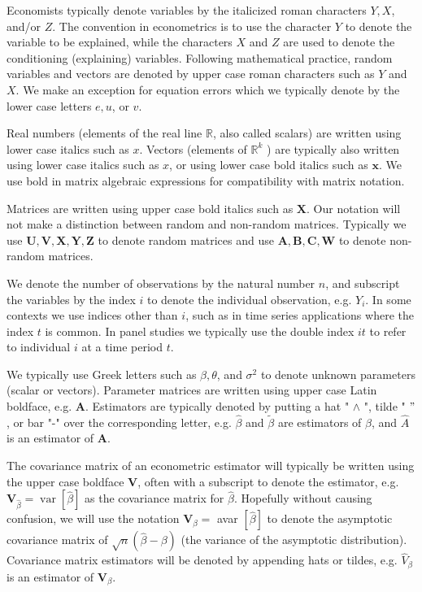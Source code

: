 \documentclass[10pt]{article}
\begin{document}
Economists typically denote variables by the italicized roman characters $Y, X$, and/or $Z$. The convention in econometrics is to use the character $Y$ to denote the variable to be explained, while the characters $X$ and $Z$ are used to denote the conditioning (explaining) variables. Following mathematical practice, random variables and vectors are denoted by upper case roman characters such as $Y$ and $X$. We make an exception for equation errors which we typically denote by the lower case letters $e, u$, or $v$.

Real numbers (elements of the real line $\mathbb{R}$, also called scalars) are written using lower case italics such as $x$. Vectors (elements of $\mathbb{R}^{k}$ ) are typically also written using lower case italics such as $x$, or using lower case bold italics such as $\boldsymbol{x}$. We use bold in matrix algebraic expressions for compatibility with matrix notation.

Matrices are written using upper case bold italics such as $\boldsymbol{X}$. Our notation will not make a distinction between random and non-random matrices. Typically we use $\boldsymbol{U}, \boldsymbol{V}, \boldsymbol{X}, \boldsymbol{Y}, \boldsymbol{Z}$ to denote random matrices and use $\boldsymbol{A}, \boldsymbol{B}, \boldsymbol{C}, \boldsymbol{W}$ to denote non-random matrices.

We denote the number of observations by the natural number $n$, and subscript the variables by the index $i$ to denote the individual observation, e.g. $Y_{i}$. In some contexts we use indices other than $i$, such as in time series applications where the index $t$ is common. In panel studies we typically use the double index $i t$ to refer to individual $i$ at a time period $t$.

We typically use Greek letters such as $\beta, \theta$, and $\sigma^{2}$ to denote unknown parameters (scalar or vectors). Parameter matrices are written using upper case Latin boldface, e.g. $\boldsymbol{A}$. Estimators are typically denoted by putting a hat " $\wedge$ ", tilde " $"$, or bar "-" over the corresponding letter, e.g. $\widehat{\beta}$ and $\widetilde{\beta}$ are estimators of $\beta$, and $\widehat{A}$ is an estimator of $\boldsymbol{A}$.

The covariance matrix of an econometric estimator will typically be written using the upper case boldface $\boldsymbol{V}$, often with a subscript to denote the estimator, e.g. $\boldsymbol{V}_{\widehat{\beta}}=\operatorname{var}[\widehat{\beta}]$ as the covariance matrix for $\widehat{\beta}$. Hopefully without causing confusion, we will use the notation $\boldsymbol{V}_{\beta}=$ avar $[\widehat{\beta}]$ to denote the asymptotic covariance matrix of $\sqrt{n}(\widehat{\beta}-\beta)$ (the variance of the asymptotic distribution). Covariance matrix estimators will be denoted by appending hats or tildes, e.g. $\widehat{V}_{\beta}$ is an estimator of $\boldsymbol{V}_{\beta}$.
\end{document}

